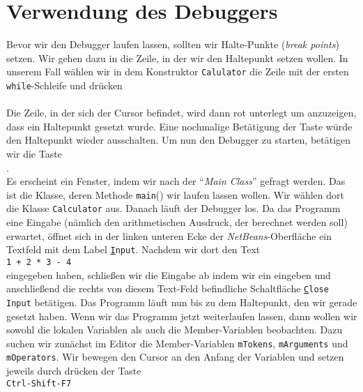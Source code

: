 \documentclass{article}
\begin{document}
\section{Verwendung des Debuggers}
Bevor wir den Debugger laufen lassen, sollten wir Halte-Punkte (\emph{break points})
setzen.  Wir gehen dazu in die Zeile, in der wir den Haltepunkt setzen wollen.
In unserem Fall w\"ahlen wir in dem Konstruktor \texttt{Calulator} die Zeile mit der ersten
\texttt{while}-Schleife  und dr\"ucken 
\\[0.1cm]
\hspace*{1.3cm}  \\[0.1cm]
Die Zeile, in der sich der Cursor befindet, wird dann rot unterlegt um anzuzeigen, dass
ein Haltepunkt gesetzt wurde.  Eine nochmalige Bet\"atigung der Taste
w\"urde den Haltepunkt wieder ausschalten.  Um nun den Debugger zu starten, bet\"atigen wir
die Taste \\[0.1cm]
\hspace*{1.3cm} . \\[0.1cm]
Es erscheint ein Fenster, indem wir nach der ``\emph{Main Class}'' gefragt werden.  
Das ist die Klasse, deren Methode \texttt{main}() wir laufen lassen wollen.
Wir w\"ahlen dort die Klasse \texttt{Calculator} aus.  Danach l\"auft der Debugger los.  Da das
Programm eine Eingabe (n\"amlich den arithmetischen Ausdruck, der berechnet werden soll)
erwartet, \"offnet sich in der linken unteren Ecke der \textsl{NetBeans}-Oberfl\"ache ein
Textfeld mit dem Label \texttt{\underline{I}nput}.  Nachdem wir dort den Text \\[0.1cm]
\hspace*{1.3cm} \texttt{1 + 2 * 3 - 4} \\[0.1cm]
eingegeben haben, schlie{\ss}en wir die Eingabe ab indem wir ein  eingeben 
und anschlie{\ss}end  die rechts von diesem Text-Feld befindliche Schaltfl\"ache
\texttt{\underline{C}lose Input} bet\"atigen.   Das Programm l\"auft nun bis zu dem
Haltepunkt, den wir gerade gesetzt haben.
Wenn wir das Programm jetzt weiterlaufen lassen, dann  wollen wir sowohl die lokalen
Variablen als auch die Member-Variablen beobachten.  Dazu suchen wir zun\"achst im Editor die
Member-Variablen \texttt{mTokens}, \texttt{mArguments} und \texttt{mOperators}.  Wir
bewegen den Cursor an den Anfang der Variablen und setzen jeweils durch
dr\"ucken der Taste \\[0.1cm]
\hspace*{1.3cm} \texttt{Ctrl-Shift-F7} \\[0.1cm]
\end{document}
